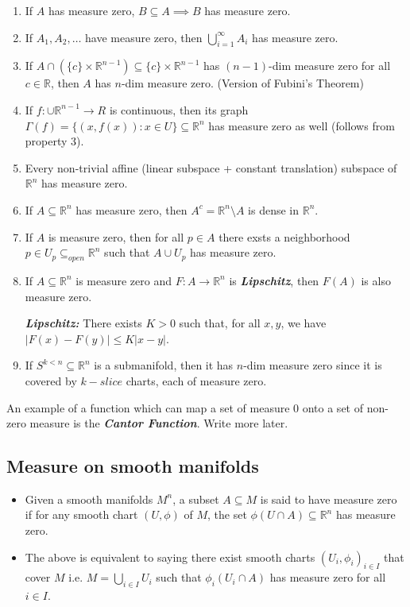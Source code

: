 \documentclass{article}
\newcommand{\R}{\mathbb{R}}
\begin{document}
\begin{enumerate}
  \item If $A$ has measure zero, $B \subseteq A \implies B$ has measure zero.
  \item If $A_1, A_2, \dots$ have measure zero, then $\bigcup_{i = 1}^{\infty} A_i$ has measure zero.
  \item If $A \cap \left(\{c\} \times \R^{n-1}\right) \subseteq \{c\} \times \R^{n-1}$ has $(n-1)$-dim measure zero for all $c \in \R$, then $A$ has $n$-dim measure zero. (Version of Fubini's Theorem)
  \item If $f : \cup \R^{n-1} \rightarrow R$ is continuous, then its graph $\Gamma(f) = \{(x, f(x)) :x \in U \} \subseteq \R^n$ has measure zero as well (follows from property 3).
  \item Every non-trivial affine (linear subspace + constant translation) subspace of $\R^n$ has measure zero.
  \item If $A \subseteq \R^n$ has measure zero, then $A^c = \R^n \setminus A$ is dense in $\R^n$.
  \item If $A$ is measure zero, then for all $p \in A$ there exsts a neighborhood $p \in U_p \subseteq_{open} \R^n$ such that $A \cup U_p$ has measure zero.
  \item If $A \subseteq \R^n$ is measure zero and $F : A \rightarrow \R^n$ is \emph{\textbf{Lipschitz}}, then $F(A)$ is also measure zero.
  \begin{dottedbox}
    \emph{\textbf{Lipschitz:}} There exists $K > 0$ such that, for all $x,y$, we have $|F(x) - F(y)| \leq K |x-y|$.
  \end{dottedbox}
  \item If $S^{k < n} \subseteq \R^{n}$ is a submanifold, then it has $n$-dim measure zero since it is covered by $k-slice$ charts, each of measure zero.
\end{enumerate}

\vskip 0.5cm
\begin{dottedbox}
  An example of a function which can map a set of measure 0 onto a set of non-zero measure is the \emph{\textbf{Cantor Function}}. Write more later.
\end{dottedbox}


\vskip 1cm
\subsection{Measure on smooth manifolds}

\vskip 0.5cm
\begin{mathdefinitionbox}{}
  \begin{itemize}
    \item Given a smooth manifolds $M^n$, a subset $A \subseteq M$ is said to have measure zero if for any smooth chart $(U, \phi)$ of $M$, the set $\phi(U \cap A) \subseteq \R^{n}$ has measure zero.
    \item The above is equivalent to saying there exist smooth charts $(U_i, \phi_i)_{i \in I}$ that cover $M$ i.e. $M = \bigcup_{i \in I} U_i$ such that $\phi_i(U_i \cap A)$ has measure zero for all $i \in I$. 
  \end{itemize}
\end{mathdefinitionbox}
\end{document}
